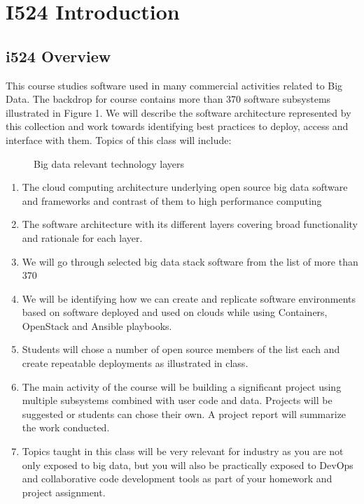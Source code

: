 \chapter{I524 Introduction}
\label{\detokenize{notes:i524-introduction}}

\section{i524 Overview}
\label{\detokenize{i524/index:index-0}}\label{\detokenize{i524/index::doc}}\label{\detokenize{i524/index:i524-overview}}
This course studies software used in many commercial activities
related to Big Data. The backdrop for course contains more than 370
software subsystems illustrated in Figure 1.  We will describe the
software architecture represented by this collection and work towards
identifying best practices to deploy, access and interface with
them. Topics of this class will include:

\begin{figure}[htbp]
\centering
\capstart

\noindent{}
\caption{Big data relevant technology layers}\label{\detokenize{i524/index:id1}}\end{figure}
\begin{enumerate}
\item {} 
The cloud computing architecture underlying open source big data
software and frameworks and contrast of them to high performance
computing

\item {} 
The software architecture with its different layers covering broad
functionality and rationale for each layer.

\item {} 
We will go through selected big data stack software from the list
of more than 370

\item {} 
We will be identifying how we can create and replicate software
environments based on software deployed and used on clouds while
using Containers, OpenStack and Ansible playbooks.

\item {} 
Students will chose a number of open source members of the list
each and create repeatable deployments as illustrated in class.

\item {} 
The main activity of the course will be building a significant
project using multiple subsystems combined with user code and
data. Projects will be suggested or students can chose their own. A
project report will summarize the work conducted.

\item {} 
Topics taught in this class will be very relevant for industry as
you are not only exposed to big data, but you will also be
practically exposed to DevOps and collaborative code development
tools as part of your homework and project assignment.

\end{enumerate}


